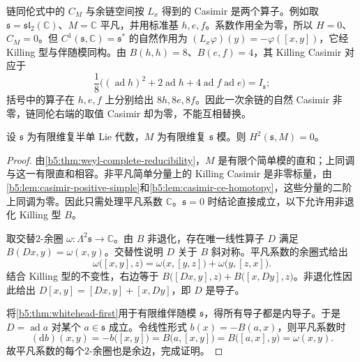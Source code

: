 链同伦式中的 \(C_M\) 与余链空间按 \(L_x\) 得到的 Casimir 是两个算子。例如取 \(\mathfrak s=\mathfrak{sl}_2(\mathbb C)\)、\(M=\mathbb C\) 平凡，并用标准基 \(h,e,f\)。系数作用全为零，所以 \(H=0\)、\(C_M=0\)。但 \(C^1(\mathfrak s,\mathbb C)=\mathfrak s^*\) 的自然作用为 \((L_x\varphi)(y)=-\varphi([x,y])\)，它经 Killing 型与伴随模同构。由 \(B(h,h)=8\)、\(B(e,f)=4\)，其 Killing Casimir 对应于
\[
	\dfrac18\bigl((\operatorname{ad}h)^2 +2\operatorname{ad}h+4\operatorname{ad}f\operatorname{ad}e\bigr) =I_{\mathfrak s};
\]
括号中的算子在 \(h,e,f\) 上分别给出 \(8h,8e,8f\)。因此一次余链的自然 Casimir 非零，链同伦右端的取值 Casimir 却为零，不能互相替换。

\begin{theorem}\label{b5:thm:whitehead-second}
	设 \(\mathfrak s\) 为有限维复半单 Lie 代数，\(M\) 为有限维复 \(\mathfrak s\) 模。则 \(H^2(\mathfrak s,M)=0\)。
\end{theorem}
\begin{proof}
	由\cref{b5:thm:weyl-complete-reducibility}，\(M\) 是有限个简单模的直和；上同调与这一有限直和相容。非平凡简单分量上的 Killing Casimir 是非零标量，由\cref{b5:lem:casimir-positive-simple}和\cref{b5:lem:casimir-ce-homotopy}，这些分量的二阶上同调为零。因此只需处理平凡系数 \(\mathbb C\)。\(\mathfrak s=0\) 时结论直接成立，以下允许用非退化 Killing 型 \(B\)。

	取交替\(2\)-余圈 \(\omega:\Lambda^2\mathfrak s\to\mathbb C\)。由 \(B\) 非退化，存在唯一线性算子 \(D\) 满足 \(B(Dx,y)=\omega(x,y)\)。交替性说明 \(D\) 关于 \(B\) 斜对称。平凡系数的余圈式给出
	\[
		\omega\bigl([x,y],z\bigr)=\omega\bigl(x,[y,z]\bigr)+\omega\bigl(y,[z,x]\bigr).
	\]
	结合 Killing 型的不变性，右边等于 \(B\bigl([Dx,y],z\bigr)+B\bigl([x,Dy],z\bigr)\)。非退化性因此给出 \(D[x,y]=[Dx,y]+[x,Dy]\)，即 \(D\) 是导子。

	将\cref{b5:thm:whitehead-first}用于有限维伴随模 \(\mathfrak s\)，得所有导子都是内导子。于是 \(D=\operatorname{ad}a\) 对某个 \(a\in\mathfrak s\) 成立。令线性形式 \(b(x)=-B(a,x)\)，则平凡系数时
	\[
		(\mathrm{d}b)(x,y)=-b\bigl([x,y]\bigr)=B\bigl(a,[x,y]\bigr) =B\bigl([a,x],y\bigr)=\omega(x,y).
	\]
	故平凡系数的每个\(2\)-余圈也是余边，完成证明。
\end{proof}


